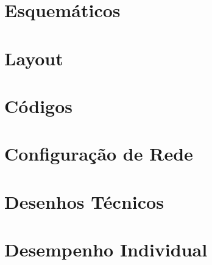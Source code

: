 \begin{anexosenv}

\partanexos

\chapter{Esquemáticos}


\chapter{Layout}


\chapter{Códigos}

\chapter{Configuração de Rede}



\chapter{Desenhos Técnicos}

\chapter{Desempenho Individual}


\end{anexosenv}

